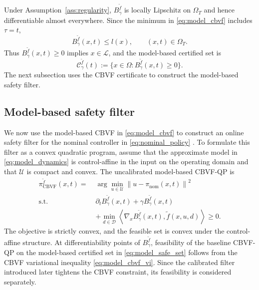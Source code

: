 \documentclass[letterpaper,10pt,conference]{ieeeconf}
\newcommand{\Bm}{B_{\gamma}^{\tilde f}}
\newcommand{\fapp}{\widetilde{f}}
\newcommand{\safe}{\mathcal{L}}
\newcommand{\xv}{x}
\newcommand{\uv}{u}
\newcommand{\dv}{d}
\newcommand{\Uv}{\mathcal{U}}
\newcommand{\Dv}{\mathcal{D}}
\newcommand{\norm}[1]{\left\lVert #1 \right\rVert}
\newcommand{\ip}[2]{\left\langle #1,#2 \right\rangle}
\begin{document}
Under Assumption~\ref{ass:regularity}, $\Bm$ is locally Lipschitz on
$\Omega_T$ and hence differentiable almost everywhere.
Since the minimum in \eqref{eq:model_cbvf} includes $\tau=t$,
\begin{equation}
    \Bm(\xv,t)\le l(\xv),
    \qquad (\xv,t)\in\Omega_T .
    \label{eq:Bm_le_l}
\end{equation}
Thus $\Bm(\xv,t)\ge0$ implies $\xv\in\safe$, and the model-based certified set is
\begin{equation}
    \mathcal C_{\gamma}^{\tilde f}(t)
    :=
    \{\xv\in\Omega:\Bm(\xv,t)\ge0\}.
    \label{eq:model_safe_set}
\end{equation}
The next subsection uses the CBVF certificate to construct the model-based
safety filter.



\subsection{Model-based safety filter}

We now use the model-based CBVF in \eqref{eq:model_cbvf} to construct an online
safety filter for the nominal controller in \eqref{eq:nominal_policy}
\cite{choi2021cbvf}. To formulate this filter as a convex quadratic program,
assume that the approximate model in \eqref{eq:model_dynamics} is
control-affine in the input on the operating domain and that $\Uv$ is compact
and convex. The uncalibrated model-based CBVF-QP is
\begin{equation}
\label{eq:model_cbvf_qp}
\begin{aligned}
\pi_{\mathrm{CBVF}}^{\tilde f}(\xv,t)
=\;& \arg\min_{\uv\in\Uv}
\norm{\uv-\pi_{\mathrm{nom}}(\xv,t)}^2 \\
\text{s.t.}\;&
\partial_t \Bm(\xv,t)+\gamma\Bm(\xv,t) \\
&+\min_{\dv\in\Dv}
\ip{\nabla_{\xv}\Bm(\xv,t)}{\fapp(\xv,\uv,\dv)}
\ge0 .
\end{aligned}
\end{equation}
The objective is strictly convex, and the feasible set is convex under the
control-affine structure. At differentiability points of $\Bm$, feasibility of
the baseline CBVF-QP on the model-based certified set in
\eqref{eq:model_safe_set} follows from the CBVF variational inequality
\eqref{eq:model_cbvf_vi}. Since the calibrated filter introduced later tightens
the CBVF constraint, its feasibility is considered separately.
\end{document}
